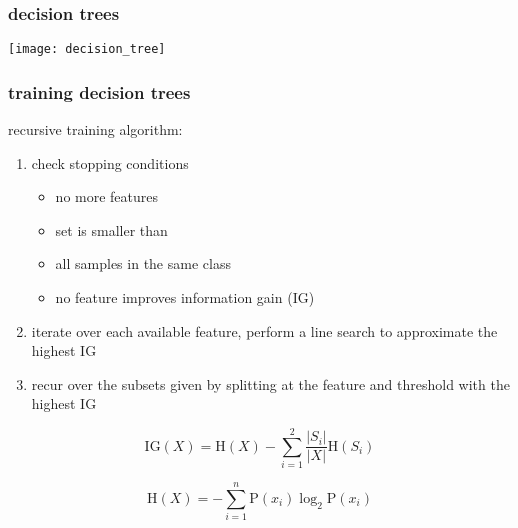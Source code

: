 \begin{frame}
  \frametitle{decision trees}
  
  	{
          \begin{center}
	  \texttt{[image: decision\_tree]}
          \end{center}
	}

\end{frame}

\begin{frame}
  \frametitle{training decision trees}
  
  recursive training algorithm:
  \begin{enumerate}
  \item check stopping conditions
    \begin{itemize}
    \item no more features
    \item set is smaller than 
    \item all samples in the same class
    \item no feature improves information gain (IG)
    \end{itemize}
  \item iterate over each available feature, perform a line search to approximate the highest IG
  \item recur over the subsets given by splitting at the feature and threshold with the highest IG 
  \end{enumerate}

\begin{equation}
  \mathrm{IG}(X) = \mathrm{H}(X) - \sum_{i=1}^{2} \frac{|S_i|}{|X|} \mathrm{H}(S_i)
\end{equation}

\begin{equation}
  \mathrm{H}(X) = -\sum_{i=1}^n {\mathrm{P}(x_i) \log_2 \mathrm{P}(x_i)}
\end{equation} 
  
\end{frame}